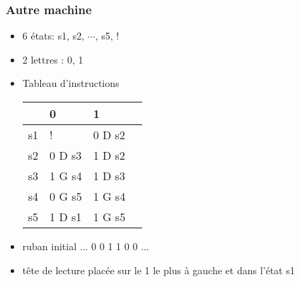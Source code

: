 \begin{frame}
  \frametitle{Autre machine}
\begin{itemize}
  \item 6 états: s1, s2, $\cdots$, s5, !
  \item 2 lettres : 0, 1
  \item Tableau d'instructions
\begin{center}
\renewcommand{\arraystretch}{1.5}
\begin{tabular}{|l|l|l|l|} \hline
   & 0  & 1     \\ \hline
s1 & !      & 0 D s2  \\ \hline
s2 & 0 D s3 & 1 D s2  \\ \hline
s3 & 1 G s4 & 1 D s3  \\ \hline
s4 & 0 G s5 & 1 G s4  \\ \hline
s5 & 1 D s1 & 1 G s5  \\ \hline
\end{tabular}
\end{center}
\item ruban initial ... 0 0 1 1 0 0 ... 
\item tête de lecture placée sur le 1 le plus à gauche et dans l'état s1
\end{itemize}
\end{frame}

